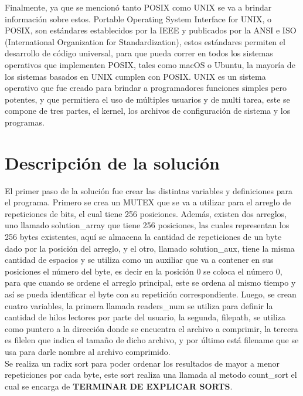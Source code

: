 \documentclass[12pt, article, natbib]{IEEEtran}
\begin{document}
Finalmente, ya que se mencionó tanto POSIX como UNIX se va a brindar información sobre estos. Portable Operating System Interface for UNIX, o POSIX, son estándares establecidos por la IEEE y publicados por la ANSI e ISO (International Organization for Standardization), estos estándares permiten el desarrollo de código universal, para que pueda correr en todos los sistemas operativos que implementen POSIX, tales como macOS o Ubuntu, la mayoría de los sistemas basados en UNIX cumplen con POSIX.\cite{universityinformationtechnologyservices_2021_about} UNIX es un sistema operativo que fue creado para brindar a programadores funciones simples pero potentes, y que permitiera el uso de múltiples usuarios y de multi tarea, este se compone de tres partes, el kernel, los archivos de configuración de sistema y los programas.\cite{idahostateuniversity_1997_what}

\section{Descripción de la solución}
El primer paso de la solución fue crear las distintas variables y definiciones para el programa. Primero se crea un MUTEX que se va a utilizar para el arreglo de repeticiones de bits, el cual tiene 256 posiciones.\cite{cppdev_2010_c} \cite{manrow_2011_c} Además, existen dos arreglos, uno llamado solution\_array que tiene 256 posiciones, las cuales representan los 256 bytes existentes, aquí se almacena la cantidad de repeticiones de un byte dado por la posición del arreglo, y el otro, llamado solution\_aux, tiene la misma cantidad de espacios y se utiliza como un auxiliar que va a contener en sus posiciones el número del byte, es decir en la posición 0 se coloca el número 0, para que cuando se ordene el arreglo principal, este se ordena al mismo tiempo y así se pueda identificar el byte con su repetición correspondiente. Luego, se crean cuatro variables, la primera llamada readers\_num se utiliza para definir la cantidad de hilos lectores por parte del usuario, la segunda, filepath, se utiliza como puntero a la dirección donde se encuentra el archivo a comprimir, la tercera es filelen que indica el tamaño de dicho archivo, y por último está filename que se usa para darle nombre al archivo comprimido.\\

Se realiza un radix sort para poder ordenar los resultados de mayor a menor repeticiones por cada byte, este sort realiza una llamada al metodo count\_sort el cual se encarga de \textbf{TERMINAR DE EXPLICAR SORTS}.\\
\end{document}

